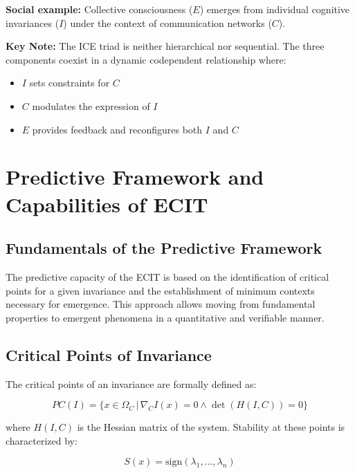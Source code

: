 \documentclass{article}
\begin{document}
\textbf{Social example:} Collective consciousness ($E$) emerges from individual cognitive invariances ($I$) under the context of communication networks ($C$).

\vspace{5mm}
\noindent
\begin{framed}
\textbf{Key Note:} The ICE triad is neither hierarchical nor sequential. The three components coexist in a dynamic codependent relationship where:
\begin{itemize}
\item $I$ sets constraints for $C$
\item $C$ modulates the expression of $I$
\item $E$ provides feedback and reconfigures both $I$ and $C$
\end{itemize}
\end{framed}

\section{Predictive Framework and Capabilities of ECIT}

\subsection{Fundamentals of the Predictive Framework}
The predictive capacity of the ECIT is based on the identification of critical points for a given invariance and the establishment of minimum contexts necessary for emergence. This approach allows moving from fundamental properties to emergent phenomena in a quantitative and verifiable manner.

\subsection{Critical Points of Invariance}
The critical points of an invariance are formally defined as:

\begin{equation}
    PC(I) = \{x \in \Omega_C \,|\, \nabla_C I(x) = 0 \wedge \det(H(I,C)) = 0\}
\end{equation}

where $H(I,C)$ is the Hessian matrix of the system. Stability at these points is characterized by:

\begin{equation}
    S(x) = \text{sign}(\lambda_1,\ldots,\lambda_n)
\end{equation}
\end{document}
